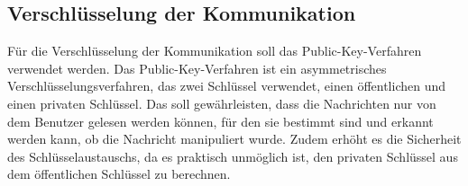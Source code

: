 \subsection{Verschlüsselung der Kommunikation}


Für die Verschlüsselung der Kommunikation soll das Public-Key-Verfahren verwendet werden.
Das Public-Key-Verfahren ist ein asymmetrisches Verschlüsselungsverfahren, das zwei Schlüssel verwendet,
einen öffentlichen und einen privaten Schlüssel. Das soll gewährleisten, dass die Nachrichten nur von
dem Benutzer gelesen werden können, für den sie bestimmt sind und erkannt werden kann, ob die Nachricht
manipuliert wurde. Zudem erhöht es die Sicherheit des Schlüsselaustauschs, da es praktisch unmöglich ist,
den privaten Schlüssel aus dem öffentlichen Schlüssel zu berechnen.




